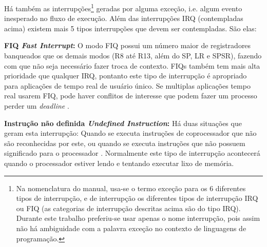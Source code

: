 Há também as interrupções\footnote{Na nomenclatura do manual, usa-se o termo exceção para os 6 diferentes tipos de interrupção, e de interrupção os diferentes tipos de interrupção IRQ ou FIQ (as categorias de interrupção descritas acima são do tipo IRQ). Durante este trabalho preferiu-se usar apenas o nome interrupção, pois assim não há ambiguidade com a palavra exceção no contexto de linguagens de programação.} geradas por alguma exceção, i.e. algum evento inesperado no fluxo de execução. Além das interrupções IRQ (contempladas acima) existem mais 5 tipos interrupções que devem ser contempladas. São elas:

\textbf{FIQ \emph{Fast Interrupt}:} O modo FIQ possui um número maior de registradores banqueados que os demais modos (R8 até R13, além do SP, LR e SPSR), fazendo com que não seja necessário fazer troca de contexto. FIQs também tem mais alta prioridade que qualquer IRQ, pontanto este tipo de interrupção é apropriado para aplicações de tempo real de usuário único. Se multiplas aplicações tempo real usarem FIQ, pode haver conflitos de interesse que podem fazer um processo perder um \emph{deadline} \cite[p.~66]{armarm}.


\textbf{Instrução não definida \emph{Undefined Instruction}:} 
Há duas situações que geram esta interrupção: Quando se executa instruções de coprocessador que não são reconhecidas por este, ou quando se executa instruções que não possuem significado para o processador \cite[p.~36]{armarm}. Normalmente este tipo de interrupção acontecerá quando o processador estiver lendo e tentando executar lixo de memória.


